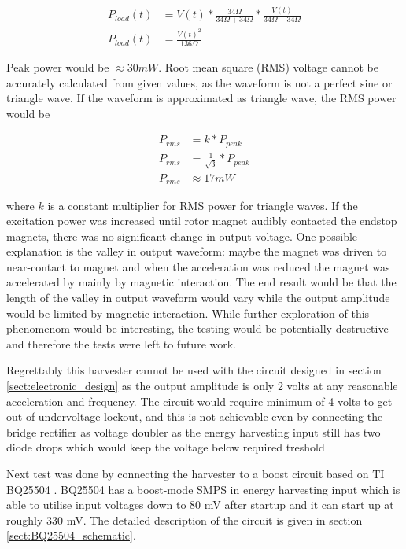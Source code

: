 \begin{equation}
\begin{split}
  P_{load}(t)& = V(t) * \frac{ 34 \Omega }{ 34 \Omega + 34 \Omega } * \frac{ V(t) }{ 34 \Omega + 34 \Omega } \\
  P_{load}(t)& = \frac{V(t)^2}{136 \Omega}
\end{split}
\end{equation}

Peak power would be $ \approx 30 mW $. Root mean square (RMS) voltage cannot be accurately calculated from given values, as the waveform is not a perfect sine or triangle wave. If the waveform is approximated as triangle wave, the RMS power would be 

\begin{equation} \label{eq:rms_power}
\begin{split}
  P_{rms}& = k * P_{peak} \\
  P_{rms}& = \frac{1}{\sqrt{3}} * P_{peak} \\
  P_{rms}& \approx 17 mW 
\end{split}
\end{equation}

where $k$ is a constant multiplier for RMS power for triangle waves. 
If the excitation power was increased until rotor magnet audibly contacted the endstop magnets, there was no significant change in output voltage. One possible explanation is the valley in output waveform: maybe the magnet was driven to near-contact to magnet and when the acceleration was reduced the magnet was accelerated by mainly by magnetic interaction. The end result would be that the length of the valley in output waveform would vary while the output amplitude would be limited by magnetic interaction. While further exploration of this phenomenom would be interesting, the testing would be potentially destructive and therefore the tests were left to future work.

Regrettably this harvester cannot be used with the circuit designed in section \ref{sect:electronic_design} as the output amplitude is only 2 volts at any reasonable acceleration and frequency. The circuit would require minimum of 4 volts to get out of undervoltage lockout, and this is not achievable even by connecting the bridge rectifier as voltage doubler as the energy harvesting input still has two diode drops which would keep the voltage below required treshold

Next test was done by connecting the harvester to a boost circuit based on TI BQ25504 \cite{BQ25504}. BQ25504 has a boost-mode SMPS in energy harvesting input which is able to utilise input voltages down to 80 mV after startup and it can start up at roughly 330 mV. The detailed description of the circuit is given in section \ref{sect:BQ25504_schematic}.

